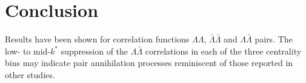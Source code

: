 \section{Conclusion}
\label{sec:Conclusion}
Results have been shown for correlation functions $\Lambda\Lambda$, $\bar{\Lambda}\bar{\Lambda}$ and $\Lambda\bar{\Lambda}$ pairs.  
The low- to mid-$k^*$ suppression of the $\Lambda\bar{\Lambda}$ correlations in each of the three centrality bins may indicate pair annihilation processes reminiscent of those reported in other studies.


